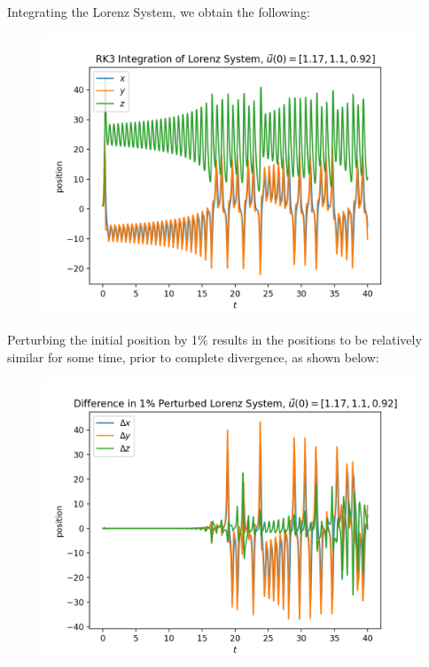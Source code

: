 \documentclass[10pt, reqno]{amsart}
\begin{document}
\begin{multicols}{2}
    Integrating the Lorenz System, we obtain the following:
    \begin{figure}[H]
        \centering
        \includegraphics[width=1\linewidth]{RK3 Integration of Lorenz System.png}
    \end{figure}
    Perturbing the initial position by 1\% results in the positions to be relatively similar for some time, prior to complete divergence, as shown below:
    \begin{figure}[H]
        \centering
        \includegraphics[width=1\linewidth]{Difference in 1 Perturbed Lorenz System.png}
    \end{figure}
\end{multicols}
\end{document}
